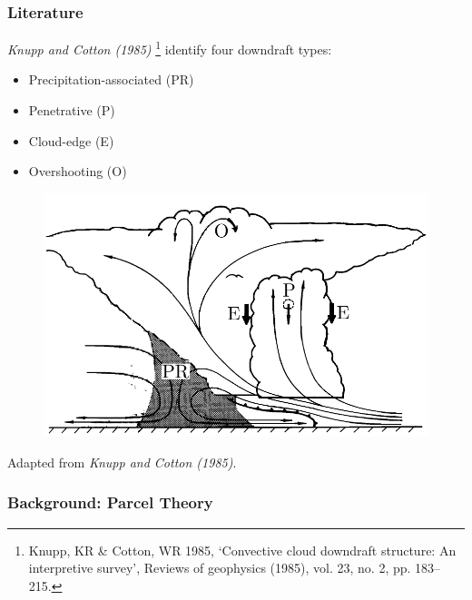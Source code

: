 \documentclass{beamer}
\begin{document}
\begin{frame}
    \frametitle{Literature}
    \emph{Knupp and Cotton (1985)}
    \footnote{ \tiny
        Knupp, KR \& Cotton, WR 1985, ‘Convective cloud downdraft
        structure: An interpretive survey’, Reviews of geophysics (1985),
        vol. 23, no. 2, pp. 183–215.}
    identify four downdraft types:
    \vspace{-2mm}
    \begin{multicols}{2}
        \small
        \begin{itemize}
            \item Precipitation-associated (PR)
            \item Penetrative (P)
            \item Cloud-edge (E)
            \item Overshooting (O)
        \end{itemize}
    \end{multicols}
    \vspace{-3mm}
    \begin{figure}[ht]
        \centering
        \includegraphics[width=0.6\linewidth]{figures/knupp_cotton_types.pdf}
    \end{figure}
    \vspace{-3mm}
    \centering \tiny Adapted from \emph{Knupp and Cotton (1985)}.

\end{frame}

\begin{frame}
    \frametitle{Background: Parcel Theory}

\end{frame}
\end{document}
